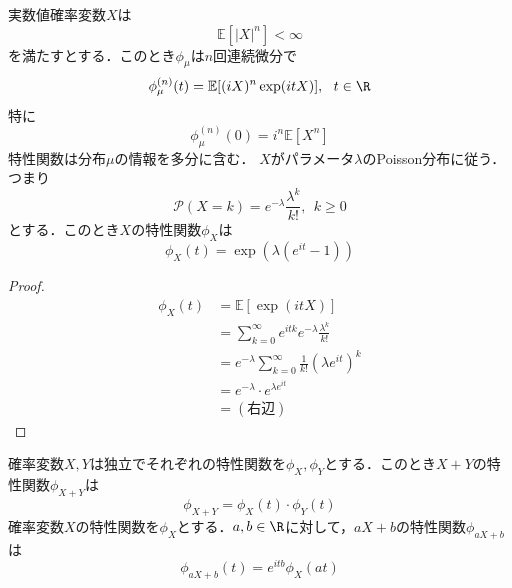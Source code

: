     実数値確率変数$X$は
\begin{equation}
    \mathbb{E}[|X|^n]< \infty
\end{equation}
    を満たすとする．このとき$\phi_\mu$は$n$回連続微分で 
\begin{equation}
    \phi^{(n)}_\mu(t)= \mathbb{E}[(iX)^n\exp(itX)],\ \ t\in \R
\end{equation}
    特に
\begin{equation}
    \phi^{(n)}_\mu(0)= i^n\mathbb{E}[X^n]
\end{equation}
    特性関数は分布$\mu$の情報を多分に含む．
    $X$がパラメータ$\lambda$のPoisson分布に従う．つまり
\begin{equation}
    \mathcal{P}(X= k)= e^{-\lambda}\frac{\lambda^k}{k!},\ \ k\ge 0
\end{equation}
    とする．このとき$X$の特性関数$\phi_X$は
\begin{equation}
    \phi_X(t)= \exp(\lambda(e^{it}- 1))
\end{equation}
\begin{proof}
\begin{align}
    \phi_X(t)
    &= \mathbb{E}[\exp(itX)]\\
    &= \sum_{k= 0}^\infty e^{itk}e^{-\lambda}\frac{\lambda^k}{k!}\\
    &= e^{-\lambda}\sum_{k= 0}^\infty \frac{1}{k!}(\lambda e^{it})^k\\
    &= e^{-\lambda}\cdot e^{\lambda e^{it}}\\
    &= (右辺)
\end{align}
\end{proof}

    確率変数$X, Y$は独立でそれぞれの特性関数を$\phi_X, \phi_Y$とする．このとき$X+ Y$の特性関数$\phi_{X+ Y}$は
\begin{equation}
    \phi_{X+ Y}= \phi_X(t)\cdot \phi_Y(t)
\end{equation}
    確率変数$X$の特性関数を$\phi_X$とする．$a, b\in \R$に対して，$aX+ b$の特性関数$\phi_{aX+ b}$は
\begin{equation}
    \phi_{aX+ b}(t)= e^{itb} \phi_X(at)
\end{equation}

